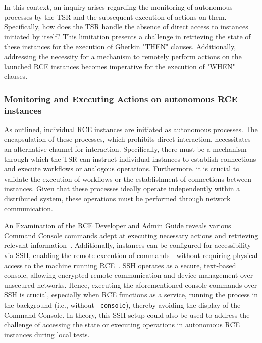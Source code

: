 In this context, an inquiry arises regarding the monitoring of autonomous processes by the \ac{TSR} and the subsequent execution of actions on them. Specifically, how does the \ac{TSR} handle the absence of direct access to instances initiated by itself? This limitation presents a challenge in retrieving the state of these instances for the execution of Gherkin "THEN" clauses. Additionally, addressing the necessity for a mechanism to remotely perform actions on the launched RCE instances becomes imperative for the execution of "WHEN" clauses.


\subsubsection{Monitoring and Executing Actions on autonomous RCE instances}
As outlined, individual RCE instances are initiated as autonomous processes. The encapsulation of these processes, which prohibits direct interaction, necessitates an alternative channel for interaction. Specifically, there must be a mechanism through which the \ac{TSR} can instruct individual instances to establish connections and execute workflows or analogous operations. Furthermore, it is crucial to validate the execution of workflows or the establishment of connections between instances. Given that these processes ideally operate independently within a distributed system, these operations must be performed through network communication.

An Examination of the \ac{RCE} Developer and Admin Guide reveals various Command Console commands adept at executing necessary actions and retrieving relevant information~\cite{rceDevGuide10x}. Additionally, instances can be configured for accessibility via \ac{SSH}, enabling the remote execution of commands—without requiring physical access to the machine running RCE~\cite{rceDevGuide10x}. \ac{SSH} operates as a secure, text-based console, allowing encrypted remote communication and device management over unsecured networks. Hence, executing the aforementioned console commands over \ac{SSH} is crucial, especially when \ac{RCE} functions as a service, running the process in the background (i.e., without \texttt{--console}), thereby avoiding the display of the Command Console. In theory, this \ac{SSH} setup could also be used to address the challenge of accessing the state or executing operations in autonomous \ac{RCE} instances during local tests.

